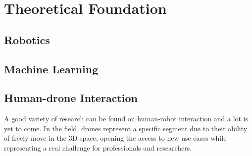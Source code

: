 \chapter{Theoretical Foundation}
\label{chap:theory}




\section{Robotics}
\label{sec:robotics}

%




\section{Machine Learning}
\label{sec:machine-learning}

%
%




\section{Human-drone Interaction}
\label{sec:human-drone-interaction}

A good variety of research can be found on human-robot interaction and a lot is yet to come. In the field, drones represent a specific segment due to their ability of freely move in the 3D space, opening the access to new use cases while representing a real challenge for professionals and researchers.

